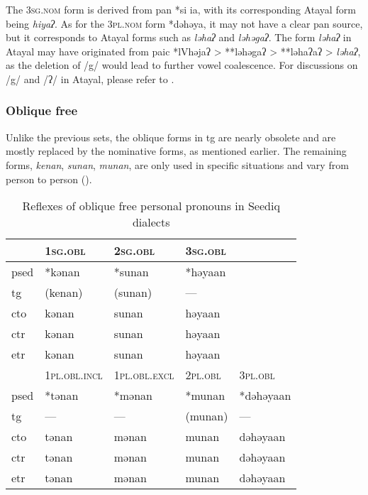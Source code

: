 The \textsc{3sg.nom} form is derived from \acs{pan} *si ia, with its corresponding Atayal form being \textit{hiyaʔ}. As for the \textsc{3pl.nom} form *dəhəya, it may not have a clear \acs{pan} source, but it corresponds to Atayal forms such as \textit{ləhaʔ} and \textit{ləhəgaʔ}. The form \textit{ləhaʔ} in Atayal may have originated from \acl{paic} *lVhəjaʔ > **ləhəgaʔ > **ləhaʔaʔ > \textit{ləhaʔ}, as the deletion of /g/ would lead to further vowel coalescence. For discussions on /g/ and /ʔ/ in Atayal, please refer to \textcite{goderich2020phd,song2023Aicgprime}. 

\subsubsection{Oblique free}

Unlike the previous sets, the oblique forms in \acl{tg} are nearly obsolete and are mostly replaced by the nominative forms, as mentioned earlier. The remaining forms, \textit{kenan}, \textit{sunan}, \textit{munan}, are only used in specific situations and vary from person to person (\cite{Sung2018Sedgrammar}).

\begin{table}[!htbp]
\centering
\caption{Reflexes of oblique free personal pronouns in Seediq dialects}
\label{tab:oblfree}
\begin{tabular}{lllll}
\hline
      & \textsc{1sg.obl}      & \textsc{2sg.obl}      & \textsc{3sg.obl} &           \\ \hline
\acs{psed} & *kənan       & *sunan       & *həyaan &           \\
\acs{tg}  & (kenan)      & (sunan)      & ---     &           \\
\acs{cto}  & kənan        & sunan        & həyaan  &           \\
\acs{ctr} & kənan        & sunan        & həyaan  &           \\
\acs{etr} & kənan        & sunan        & həyaan  &           \\ \hline
      & \textsc{1pl.obl.incl} & \textsc{1pl.obl.excl} & \textsc{2pl.obl} & \textsc{3pl.obl}   \\ \hline
\acs{psed} & *tənan       & *mənan       & *munan  & *dəhəyaan \\
\acs{tg}  & ---          & ---          & (munan) & ---       \\
\acs{cto}  & tənan        & mənan        & munan   & dəhəyaan  \\
\acs{ctr} & tənan        & mənan        & munan   & dəhəyaan  \\
\acs{etr} & tənan        & mənan        & munan   & dəhəyaan  \\ \hline
\end{tabular}
\end{table}

